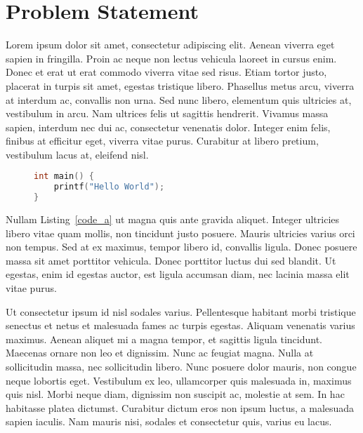 \section{Problem Statement}


Lorem ipsum dolor sit amet, consectetur adipiscing elit. Aenean viverra eget sapien in fringilla. Proin ac neque non lectus vehicula laoreet in cursus enim. Donec et erat ut erat commodo viverra vitae sed risus. Etiam tortor justo, placerat in turpis sit amet, egestas tristique libero. Phasellus metus arcu, viverra at interdum ac, convallis non urna. Sed nunc libero, elementum quis ultricies at, vestibulum in arcu. Nam ultrices felis ut sagittis hendrerit. Vivamus massa sapien, interdum nec dui ac, consectetur venenatis dolor. Integer enim felis, finibus at efficitur eget, viverra vitae purus. Curabitur at libero pretium, vestibulum lacus at, eleifend nisl.

\begin{figure}[tb]
\centering
\begin{minipage}[b]{0.90\textwidth}
    \begin{lstlisting}[language=C,captionpos=b,caption=This C snipped is important. Short description.,label=code_a]
int main() {
    printf("Hello World");
}
    \end{lstlisting}
\end{minipage}
\end{figure}

Nullam Listing~\ref{code_a} ut magna quis ante gravida aliquet. Integer ultricies libero vitae quam mollis, non tincidunt justo posuere. Mauris ultricies varius orci non tempus. Sed at ex maximus, tempor libero id, convallis ligula. Donec posuere massa sit amet porttitor vehicula. Donec porttitor luctus dui sed blandit. Ut egestas, enim id egestas auctor, est ligula accumsan diam, nec lacinia massa elit vitae purus.

Ut consectetur ipsum id nisl sodales varius. Pellentesque habitant morbi tristique senectus et netus et malesuada fames ac turpis egestas. Aliquam venenatis varius maximus. Aenean aliquet mi a magna tempor, et sagittis ligula tincidunt. Maecenas ornare non leo et dignissim. Nunc ac feugiat magna. Nulla at sollicitudin massa, nec sollicitudin libero. Nunc posuere dolor mauris, non congue neque lobortis eget. Vestibulum ex leo, ullamcorper quis malesuada in, maximus quis nisl. Morbi neque diam, dignissim non suscipit ac, molestie at sem. In hac habitasse platea dictumst. Curabitur dictum eros non ipsum luctus, a malesuada sapien iaculis. Nam mauris nisi, sodales et consectetur quis, varius eu lacus.

